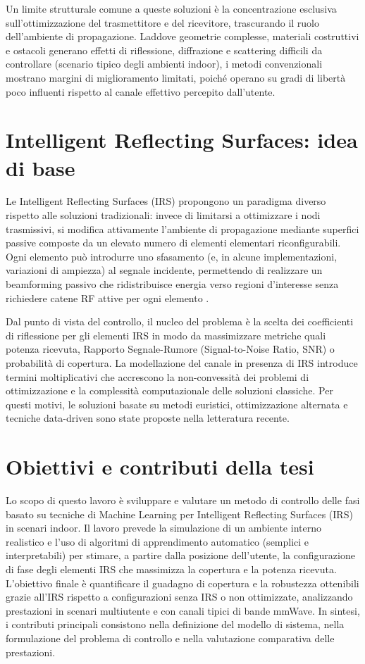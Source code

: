 \documentclass[12pt,a4paper]{report}
\begin{document}
Un limite strutturale comune a queste soluzioni è la concentrazione
esclusiva sull'ottimizzazione del trasmettitore e del ricevitore,
trascurando il ruolo dell'ambiente di propagazione. Laddove geometrie
complesse, materiali costruttivi e ostacoli generano effetti di
riflessione, diffrazione e scattering difficili da controllare
(scenario tipico degli ambienti indoor), i metodi convenzionali
mostrano margini di miglioramento limitati, poiché operano su gradi
di libertà poco influenti rispetto al canale effettivo percepito dall'utente.

\newpage
\section{Intelligent Reflecting Surfaces: idea di base}
Le Intelligent Reflecting Surfaces (IRS) propongono un paradigma
diverso rispetto alle soluzioni tradizionali: invece di limitarsi a
ottimizzare i nodi trasmissivi, si modifica attivamente l'ambiente di
propagazione mediante superfici passive composte da un elevato numero
di elementi elementari riconfigurabili. Ogni elemento può introdurre
uno sfasamento (e, in alcune implementazioni, variazioni di ampiezza)
al segnale incidente, permettendo di realizzare un beamforming
passivo che ridistribuisce energia verso regioni d'interesse senza
richiedere catene RF attive per ogni elemento \cite{3gpp_tr38857,wu2021irs}.

Dal punto di vista del controllo, il nucleo del problema è la scelta
dei coefficienti di riflessione per gli elementi IRS in modo da
massimizzare metriche quali potenza ricevuta, Rapporto Segnale-Rumore
(Signal-to-Noise Ratio, SNR) o probabilità di copertura. La
modellazione del canale in presenza di IRS introduce termini
moltiplicativi che accrescono la non-convessità dei problemi di
ottimizzazione e la complessità computazionale delle soluzioni
classiche. Per questi motivi, le soluzioni basate su metodi
euristici, ottimizzazione alternata e tecniche data-driven sono state
proposte nella letteratura recente.

\section{Obiettivi e contributi della tesi}
Lo scopo di questo lavoro è sviluppare e valutare un metodo di
controllo delle fasi basato su tecniche di Machine Learning per
Intelligent Reflecting Surfaces (IRS) in scenari indoor. Il lavoro
prevede la simulazione di un ambiente interno realistico e l'uso di
algoritmi di apprendimento automatico (semplici e interpretabili) per
stimare, a partire dalla posizione dell'utente, la configurazione di
fase degli elementi IRS che massimizza la copertura e la potenza
ricevuta. L'obiettivo finale è quantificare il guadagno di copertura
e la robustezza ottenibili grazie all'IRS rispetto a configurazioni
senza IRS o non ottimizzate, analizzando prestazioni in scenari
multiutente e con canali tipici di bande mmWave. In sintesi, i
contributi principali consistono nella definizione del modello di
sistema, nella formulazione del problema di controllo e nella
valutazione comparativa delle prestazioni.
\end{document}
